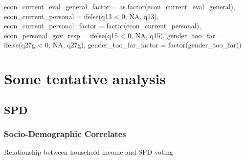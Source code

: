 \documentclass[
]{article}
\newenvironment{Shaded}{\begin{snugshade}}{\end{snugshade}}
\newcommand{\AttributeTok}[1]{\textcolor[rgb]{0.77,0.63,0.00}{#1}}
\newcommand{\ConstantTok}[1]{\textcolor[rgb]{0.00,0.00,0.00}{#1}}
\newcommand{\DecValTok}[1]{\textcolor[rgb]{0.00,0.00,0.81}{#1}}
\newcommand{\FunctionTok}[1]{\textcolor[rgb]{0.00,0.00,0.00}{#1}}
\newcommand{\NormalTok}[1]{#1}
\newcommand{\SpecialCharTok}[1]{\textcolor[rgb]{0.00,0.00,0.00}{#1}}
\begin{document}
\begin{Shaded}
\begin{Highlighting}[]
         \AttributeTok{econ\_current\_eval\_general\_factor =} \FunctionTok{as.factor}\NormalTok{(econ\_current\_eval\_general),}
         \AttributeTok{econ\_current\_personal =} \FunctionTok{ifelse}\NormalTok{(q13 }\SpecialCharTok{\textless{}} \DecValTok{0}\NormalTok{, }\ConstantTok{NA}\NormalTok{, q13), }
         \AttributeTok{econ\_current\_personal\_factor =} \FunctionTok{factor}\NormalTok{(econ\_current\_personal),}
         \AttributeTok{econ\_personal\_gov\_resp =} \FunctionTok{ifelse}\NormalTok{(q15 }\SpecialCharTok{\textless{}} \DecValTok{0}\NormalTok{, }\ConstantTok{NA}\NormalTok{, q15),}
         \AttributeTok{gender\_too\_far =} \FunctionTok{ifelse}\NormalTok{(q27g }\SpecialCharTok{\textless{}} \DecValTok{0}\NormalTok{, }\ConstantTok{NA}\NormalTok{, q27g),}
         \AttributeTok{gender\_too\_far\_factor =} \FunctionTok{factor}\NormalTok{(gender\_too\_far))}
\end{Highlighting}
\end{Shaded}

\hypertarget{some-tentative-analysis}{%
\section{Some tentative analysis}\label{some-tentative-analysis}}

\hypertarget{spd}{%
\subsection{SPD}\label{spd}}

\hypertarget{socio-demographic-correlates}{%
\subsubsection{Socio-Demographic
Correlates}\label{socio-demographic-correlates}}

Relationship between household income and SPD voting
\end{document}
